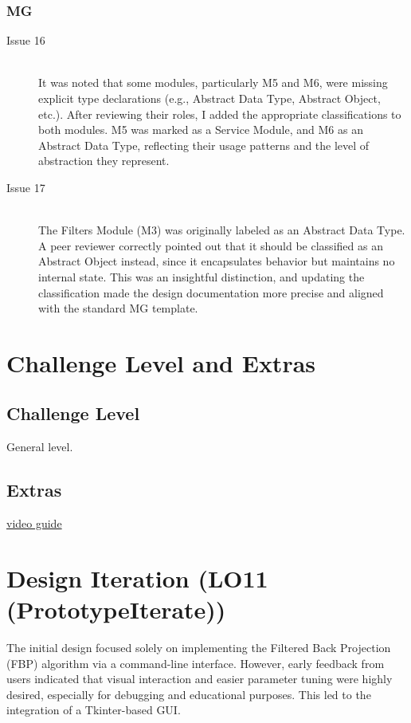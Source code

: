 \documentclass{article}
\begin{document}
\subsubsection{MG}
\begin{description}
\item[Issue 16] \hfill \\
  It was noted that some modules, particularly M5 and M6, were missing explicit
  type declarations (e.g., Abstract Data Type, Abstract Object, etc.). After
  reviewing their roles, I added the appropriate classifications to both
  modules. M5 was marked as a Service Module, and M6 as an Abstract Data Type,
  reflecting their usage patterns and the level of abstraction they represent.
\item[Issue 17] \hfill \\
  The Filters Module (M3) was originally labeled as an Abstract Data Type. A
  peer reviewer correctly pointed out that it should be classified as an
  Abstract Object instead, since it encapsulates behavior but maintains no
  internal state. This was an insightful distinction, and updating the
  classification made the design documentation more precise and aligned with the
  standard MG template.
\end{description}

\section{Challenge Level and Extras}

\subsection{Challenge Level}
General level.

\subsection{Extras}

\href{https://youtu.be/axvVFo77N7o}{video guide}
\section{Design Iteration (LO11 (PrototypeIterate))}
The initial design focused solely on implementing the Filtered Back Projection (FBP) algorithm via a command-line interface. However, early feedback from users indicated that visual interaction and easier parameter tuning were highly desired, especially for debugging and educational purposes. This led to the integration of a Tkinter-based GUI.
\end{document}

